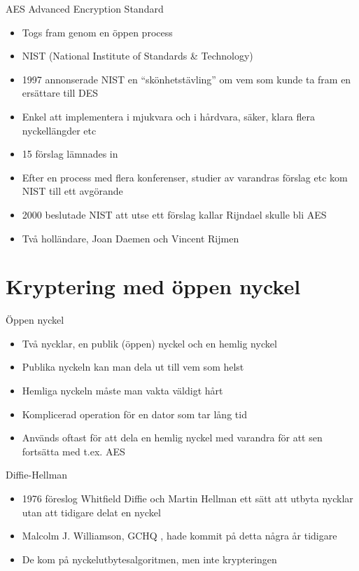 \documentclass{beamer}
\begin{document}
\begin{frame}{AES Advanced Encryption Standard}
\begin{itemize}
\item Togs fram genom en öppen process
\pause \item NIST (National Institute of Standards \& Technology)
\pause \item 1997 annonserade NIST en ``skönhetstävling'' om vem som kunde ta fram en ersättare till DES
\pause \item Enkel att implementera i mjukvara och i hårdvara, säker, klara flera nyckellängder etc
\pause \item 15 förslag lämnades in
\pause \item Efter en process med flera konferenser, studier av varandras förslag etc kom NIST till ett avgörande
\pause \item 2000 beslutade NIST att utse ett förslag kallar Rijndael skulle bli AES
\pause \item Två holländare, Joan Daemen och Vincent Rijmen
\end{itemize}
\end{frame}


\section{Kryptering med öppen nyckel}

\begin{frame}{Öppen nyckel}
\begin{itemize}
\pause \item Två nycklar, en publik (öppen) nyckel och en hemlig nyckel
\pause \item Publika nyckeln kan man dela ut till vem som helst
\pause \item Hemliga nyckeln måste man vakta väldigt hårt
\pause \item Komplicerad operation för en dator som tar lång tid
\pause \item Används oftast för att dela en hemlig nyckel med varandra för att sen fortsätta
med t.ex. AES
\end{itemize}
\end{frame}

\begin{frame}{Diffie-Hellman}
\begin{itemize}
\item 1976 föreslog Whitfield Diffie och Martin Hellman ett sätt att utbyta nycklar utan 
att tidigare delat en nyckel
\pause \item Malcolm J. Williamson, GCHQ , hade kommit på detta några år tidigare
\pause \item De kom på nyckelutbytesalgoritmen, men inte krypteringen
\end{itemize}
\end{frame}
\end{document}
